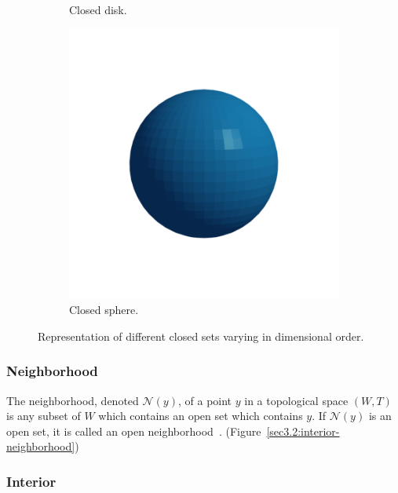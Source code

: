\documentclass[a4paper,11pt,oneside]{article}
\begin{document}
\begin{figure}[ht]
\begin{subfigure}[b]{0.2\textwidth}
		\caption{Closed disk.}
	\end{subfigure}
	\hfill
	\begin{subfigure}[b]{0.2\textwidth}
		\centering
		\includegraphics[width=\textwidth]{section3/3.2/closed-sphere.png}
		\caption{Closed sphere.}
	\end{subfigure}
	\hfill
	\caption{Representation of different closed sets varying in dimensional order.}
	\label{sec3.2:closed-sets}
\end{figure}

\subsubsection{Neighborhood}
     
\begin{definition}
	The neighborhood, denoted $\mathcal{N}(y)$, of a point $y$ in a topological space $(W, T)$ is any subset of $W$ which contains an open set which contains $y$. If $\mathcal{N}(y)$ is an open set, it is called an open neighborhood~\cite{Requicha1978MathematicalFO}. (Figure~\ref{sec3.2:interior-neighborhood})
\end{definition}
    
\subsubsection{Interior}
     
\end{document}
